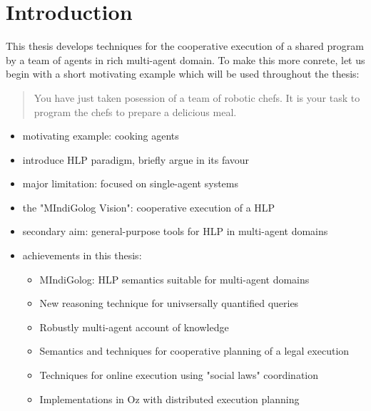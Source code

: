 \chapter{Introduction}

This thesis develops techniques for the cooperative execution of a shared 
program by a team of agents in rich multi-agent domain.  To make this more 
conrete, let us begin with a short motivating example which will be used 
throughout the thesis:

\begin{quote}
You have just taken posession of a team of robotic chefs.  It is your 
task to program the chefs to prepare a delicious meal.
\end{quote} 



\begin{itemize}
\item motivating example: cooking agents
\item introduce HLP paradigm, briefly argue in its favour
\item major limitation: focused on single-agent systems
\item the "MIndiGolog Vision": cooperative execution of a HLP
\item secondary aim: general-purpose tools for HLP in multi-agent domains
\item achievements in this thesis:
  \begin{itemize}
  \item MIndiGolog: HLP semantics suitable for multi-agent domains
  \item New reasoning technique for univsersally quantified queries
  \item Robustly multi-agent account of knowledge
  \item Semantics and techniques for cooperative planning of a legal execution
  \item Techniques for online execution using "social laws" coordination
  \item Implementations in Oz with distributed execution planning
  \end{itemize}
\end{itemize}

